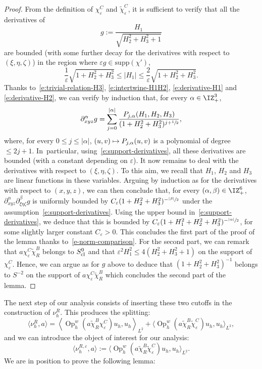 \documentclass[10pt]{amsart}
\newcommand\mto{\mathchoice{\longmapsto}{\mapsto}{\mapsto}{\mapsto}}
\theoremstyle{plain}
\theoremstyle{definition}
\theoremstyle{remark}
\newcommand{\Op}{\operatorname{Op}}
\begin{document}
\begin{proof}
From the definition of $\chi_\varepsilon^C$ and $\tilde{\chi}_\varepsilon^C$, it is sufficient to verify that all the derivatives of
\[
g:=\frac{H_1}{\sqrt{H_2^2+H_3^2+1}}
\]
are bounded (with some further decay for the derivatives with respect to $(\xi,\eta,\zeta)$) in the region where $\varepsilon g\in\text{supp}(\chi')$, \ie
\begin{equation}\label{e:support-derivatives}
\frac{1}{\varepsilon}\sqrt{1+H_2^2+H_3^2}\leq |H_1|\leq \frac{2}{\varepsilon}\sqrt{1+H_2^2+H_3^2}.
\end{equation}
Thanks to~\eqref{e:trivial-relation-H3}, \eqref{e:intertwine-H1H2}, \eqref{e:derivative-H1} and \eqref{e:derivative-H2}, we can verify by induction that, for every $\alpha\in\IZ_+^3$,
\[
\partial_{xyz}^{\alpha}g=\sum_{j=0}^{|\alpha|}\frac{P_{j,\alpha}(H_1,H_2, H_3)}{(1+H_2^2+H_3^2)^{j+\sfrac{1}{2}}},
\]
where, for every $0\leq j\leq |\alpha|$, $(u,v)\mto P_{j,\alpha}(u,v)$ is a polynomial of degree $\leq 2j+1$. In~particular, using~\eqref{e:support-derivatives}, all these derivatives are bounded (with a constant depending on $\varepsilon$). It now remains to deal with the derivatives with respect to $(\xi,\eta,\zeta)$. To this aim, we recall that $H_1$, $H_2$ and $H_3$ are linear functions in these variables. Arguing by induction as for the derivatives with respect to $(x,y,z)$, we can then conclude that, for every $(\alpha,\beta)\in \IZ_+^6$, $\partial_{xyz}^\alpha\partial_{\xi\eta\zeta}^\beta g$ is uniformly bounded by $C_\varepsilon (1+H_2^2+H_3^2)^{-\sfrac{|\beta|}{2}}$ under the assumption~\eqref{e:support-derivatives}. Using the upper bound in~\eqref{e:support-derivatives}, we deduce that this is bounded by $C_\varepsilon(1+H_1^2+H_2^2+H_3^2)^{-\sfrac{|\alpha|}{2}}$, for some slightly larger constant $C_\varepsilon>0$. This concludes the first part of the proof of the lemma thanks to~\eqref{e-norm-comparison}. For the second part, we can remark that $a\chi_\varepsilon^C\tilde{\chi}_R^B$ belongs to $S^0_{\textup{cl}}$ and that $ \varepsilon^2H_1^2\leq 4(H_2^2+H_3^2+1)$ on the support of $\chi_\varepsilon^C$. Hence, we can argue as for $g$ above to deduce that $(1+H_2^2+H_3^2)^{-1}$ belongs to $S^{-2}$ on the support of $a\chi_\varepsilon^C\tilde{\chi}_R^B$ which concludes the second part of the lemma.
\end{proof}

The next step of our analysis consists of inserting these two cutoffs in the construction of $\nu_h^R$. This produces the splitting:
\[
\langle\nu_h^R,a\rangle=\left\langle \Op_h^w(a\tilde{\chi}_R^B\chi_\varepsilon^C)u_h,u_h\right\rangle_{L^2}
+\bigl\langle \Op_h^w(a\tilde{\chi}_R^B\tilde{\chi}_\varepsilon^C)u_h,u_h\bigr\rangle_{L^2},
\]
and we can introduce the object of interest for our analysis:
\begin{equation}\label{e:measure-cone-infinity}
\langle\nu_h^{R,\varepsilon},a\rangle:=\bigl\langle \Op_h^w(a\tilde{\chi}_R^B\tilde{\chi}_\varepsilon^C)u_h,u_h\bigr\rangle_{L^2}.
\end{equation}
We are in position to prove the following lemma:
\end{document}
